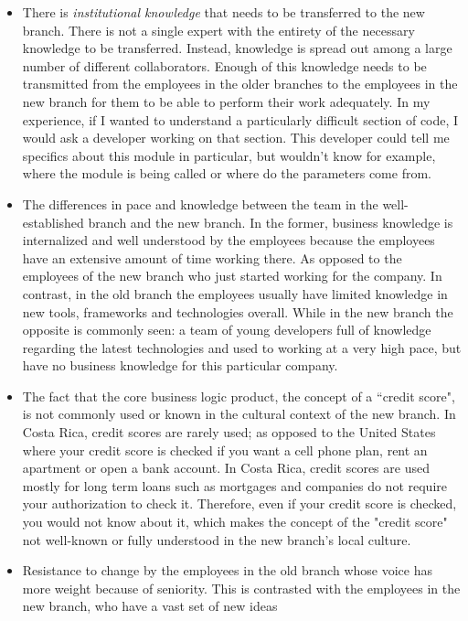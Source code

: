 \documentclass[12pt, letterpaper]{article}
\begin{document}
\begin{itemize}
  \item There is \textit{institutional knowledge} that needs to be transferred to the new branch. There is not a single expert with  the entirety of the necessary knowledge to be transferred. Instead, knowledge is spread out among a 
  large number of different collaborators. Enough of this knowledge needs to be transmitted from the employees in the 
  older branches to the employees in the new 
  branch for them to be able to perform their work adequately. In my experience, if I wanted to understand a particularly difficult
  section of code, I would ask a developer working on that section. This developer could tell me specifics about this 
  module in particular, but wouldn't know for example, where the module is being called or where do the parameters come
  from.
  \item The differences in pace and knowledge between the team in the well-established branch and the new branch.
  In the former, business knowledge is internalized and well understood by the employees 
  because the employees have an extensive amount of time working there. As opposed to the employees of the new
  branch who just started working for the company. 
 In contrast, in the old branch the employees usually have limited knowledge in new tools, 
  frameworks and technologies overall. While in the new branch the opposite is
  commonly seen: a team of young developers full of knowledge regarding the latest technologies and used to working at a 
  very high pace, but have no business knowledge for this particular company. 
  \item The fact that the core business logic product, the concept of a ``credit score", is not commonly used or known in the 
  cultural context of the new branch. In Costa Rica, credit scores are rarely used; as opposed to the 
  United States where your credit score is checked if you want a cell phone plan, rent an apartment or open a bank account.
  In Costa Rica, credit scores are used mostly for long term loans such as mortgages and companies do not require your
  authorization to check it. Therefore, even if
  your credit score is checked, you would not know about it, which makes the concept of the "credit score" not well-known or fully understood in the new branch's local culture.
  \item Resistance to change by the employees in the old branch whose voice has more weight
  because of seniority. This is contrasted with the employees in the new branch, who have a vast set of new ideas 

\end{itemize}
\end{document}
